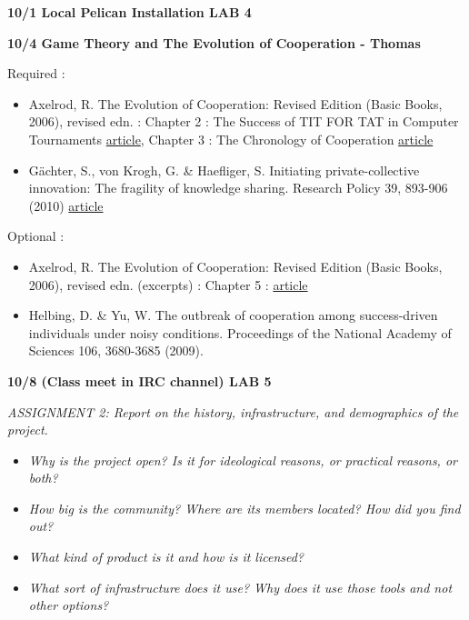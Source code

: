 \textbf{10/1 Local Pelican Installation LAB 4}

\textbf{10/4 Game Theory and The Evolution of Cooperation - Thomas}

Required :

\begin{itemize}
\itemsep1pt\parskip0pt
\item
  Axelrod, R. The Evolution of Cooperation: Revised Edition (Basic
  Books, 2006), revised edn. : Chapter 2 : The Success of TIT FOR TAT in
  Computer Tournaments
  \href{http://jcr.sagepub.com/content/24/1/3.short}{article}, Chapter 3
  : The Chronology of Cooperation
  \href{http://www.jstor.org/stable/1961366}{article}
\item
  Gächter, S., von Krogh, G. \& Haefliger, S. Initiating
  private-collective innovation: The fragility of knowledge sharing.
  Research Policy 39, 893-906 (2010)
  \href{http://www.smi.ethz.ch/news/docs/GachtervonKroghHaefliger_ResPol2010.pdf}{article}
\end{itemize}

Optional :

\begin{itemize}
\itemsep1pt\parskip0pt
\item
  Axelrod, R. The Evolution of Cooperation: Revised Edition (Basic
  Books, 2006), revised edn. (excerpts) : Chapter 5 :
  \href{http://www.sciencemag.org/content/211/4489/1390.short}{article}
\item
  Helbing, D. \& Yu, W. The outbreak of cooperation among success-driven
  individuals under noisy conditions. Proceedings of the National
  Academy of Sciences 106, 3680-3685 (2009).
\end{itemize}

\textbf{10/8 (Class meet in IRC channel) LAB 5}

\emph{ASSIGNMENT 2: Report on the history, infrastructure, and
demographics of the project.}

\begin{itemize}
\itemsep1pt\parskip0pt
\item
  \emph{Why is the project open? Is it for ideological reasons, or
  practical reasons, or both?}
\item
  \emph{How big is the community? Where are its members located? How did
  you find out?}
\item
  \emph{What kind of product is it and how is it licensed?}
\item
  \emph{What sort of infrastructure does it use? Why does it use those
  tools and not other options?}
\end{itemize}

